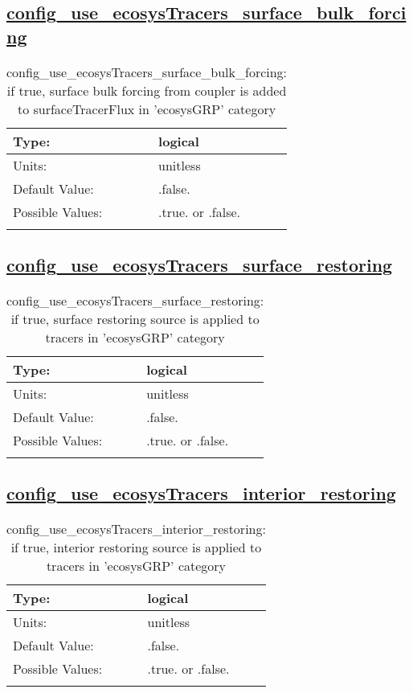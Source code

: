 \subsection[config\_use\_ecosysTracers\_surface\_bulk\_forcing]{\hyperref[sec:nm_tab_tracer_forcing_ecosysTracers]{config\_use\_ecosysTracers\_surface\_bulk\_forcing}}
\label{subsec:nm_sec_config_use_ecosysTracers_surface_bulk_forcing}
\begin{center}
\begin{longtable}{| p{2.0in} || p{4.0in} |}
    \hline
    Type: & logical \\
    \hline
    Units: & \si{unitless} \\
    \hline
    Default Value: & .false. \\
    \hline
    Possible Values: & .true. or .false. \\
    \hline
    \caption{config\_use\_ecosysTracers\_surface\_bulk\_forcing: if true, surface bulk forcing from coupler is added to surfaceTracerFlux in 'ecosysGRP' category}
\end{longtable}
\end{center}
\subsection[config\_use\_ecosysTracers\_surface\_restoring]{\hyperref[sec:nm_tab_tracer_forcing_ecosysTracers]{config\_use\_ecosysTracers\_surface\_restoring}}
\label{subsec:nm_sec_config_use_ecosysTracers_surface_restoring}
\begin{center}
\begin{longtable}{| p{2.0in} || p{4.0in} |}
    \hline
    Type: & logical \\
    \hline
    Units: & \si{unitless} \\
    \hline
    Default Value: & .false. \\
    \hline
    Possible Values: & .true. or .false. \\
    \hline
    \caption{config\_use\_ecosysTracers\_surface\_restoring: if true, surface restoring source is applied to tracers in 'ecosysGRP' category}
\end{longtable}
\end{center}
\subsection[config\_use\_ecosysTracers\_interior\_restoring]{\hyperref[sec:nm_tab_tracer_forcing_ecosysTracers]{config\_use\_ecosysTracers\_interior\_restoring}}
\label{subsec:nm_sec_config_use_ecosysTracers_interior_restoring}
\begin{center}
\begin{longtable}{| p{2.0in} || p{4.0in} |}
    \hline
    Type: & logical \\
    \hline
    Units: & \si{unitless} \\
    \hline
    Default Value: & .false. \\
    \hline
    Possible Values: & .true. or .false. \\
    \hline
    \caption{config\_use\_ecosysTracers\_interior\_restoring: if true, interior restoring source is applied to tracers in 'ecosysGRP' category}
\end{longtable}
\end{center}
